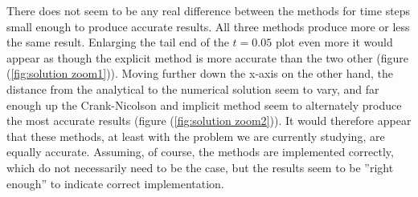 \documentclass[a4paper,11pt]{report}
\begin{document}
There does not seem to be any real difference between the methods for time steps small enough to produce accurate results. All three methods produce more or less the same result. Enlarging the tail end of the \(t = 0.05\) plot even more it would appear as though the explicit method is more accurate than the two other (figure (\ref{fig:solution zoom1})). Moving further down the x-axis on the other hand, the distance from the analytical to the numerical solution seem to vary, and far enough up the Crank-Nicolson and implicit method seem to alternately produce the most accurate results (figure (\ref{fig:solution zoom2})). It would therefore appear that these methods, at least with the problem we are currently studying, are equally accurate. Assuming, of course, the methods are implemented correctly, which do not necessarily need to be the case, but the results seem to be ''right enough'' to indicate correct implementation.
\end{document}

